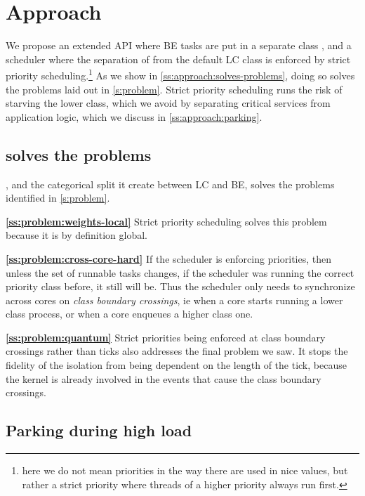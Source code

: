 \section{Approach}\label{s:approach}

We propose an extended \cgroups{} API where BE tasks are put in a separate class
\beclass{}, and a scheduler where the separation of \beclass{} from the default
LC class is enforced by strict priority scheduling.\footnote{here we do not mean
priorities in the way there are used in nice values, but rather a strict
priority where threads of a higher priority always run first.} As we show in
\autoref{ss:approach:solves-problems}, doing so solves the problems laid out in
\autoref{s:problem}. Strict priority scheduling runs the risk of starving the
lower class, which we avoid by separating critical services from application logic,
which we discuss in \autoref{ss:approach:parking}.

\subsection{\beclass{} solves the problems}\label{ss:approach:solves-problems}

\beclass{}, and the categorical split it create between LC and BE, solves the
problems identified in \autoref{s:problem}.

\textbf{\autoref{ss:problem:weights-local}} Strict priority scheduling solves
this problem because it is by definition global.

\textbf{\autoref{ss:problem:cross-core-hard}} If the scheduler is enforcing
priorities, then unless the set of runnable tasks changes, if the scheduler was
running the correct priority class before, it still will be. Thus the scheduler
only needs to synchronize across cores on \textit{class boundary crossings}, ie
when a core starts running a lower class process, or when a core enqueues a
higher class one. 

\textbf{\autoref{ss:problem:quantum}} Strict priorities being enforced at class
boundary crossings rather than ticks also addresses the final problem we saw. It
stops the fidelity of the isolation from being dependent on the length of the
tick, because the kernel is already involved in the events that cause the class
boundary crossings.

\subsection{Parking during high load}\label{ss:approach:parking}

